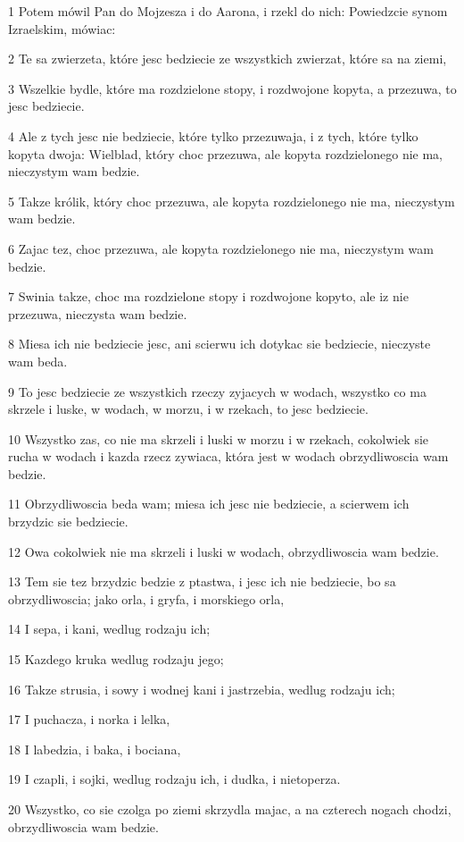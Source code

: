 \par 1 Potem mówil Pan do Mojzesza i do Aarona, i rzekl do nich: Powiedzcie synom Izraelskim, mówiac:
\par 2 Te sa zwierzeta, które jesc bedziecie ze wszystkich zwierzat, które sa na ziemi,
\par 3 Wszelkie bydle, które ma rozdzielone stopy, i rozdwojone kopyta, a przezuwa, to jesc bedziecie.
\par 4 Ale z tych jesc nie bedziecie, które tylko przezuwaja, i z tych, które tylko kopyta dwoja: Wielblad, który choc przezuwa, ale kopyta rozdzielonego nie ma, nieczystym wam bedzie.
\par 5 Takze królik, który choc przezuwa, ale kopyta rozdzielonego nie ma, nieczystym wam bedzie.
\par 6 Zajac tez, choc przezuwa, ale kopyta rozdzielonego nie ma, nieczystym wam bedzie.
\par 7 Swinia takze, choc ma rozdzielone stopy i rozdwojone kopyto, ale iz nie przezuwa, nieczysta wam bedzie.
\par 8 Miesa ich nie bedziecie jesc, ani scierwu ich dotykac sie bedziecie, nieczyste wam beda.
\par 9 To jesc bedziecie ze wszystkich rzeczy zyjacych w wodach, wszystko co ma skrzele i luske, w wodach, w morzu, i w rzekach, to jesc bedziecie.
\par 10 Wszystko zas, co nie ma skrzeli i luski w morzu i w rzekach, cokolwiek sie rucha w wodach i kazda rzecz zywiaca, która jest w wodach obrzydliwoscia wam bedzie.
\par 11 Obrzydliwoscia beda wam; miesa ich jesc nie bedziecie, a scierwem ich brzydzic sie bedziecie.
\par 12 Owa cokolwiek nie ma skrzeli i luski w wodach, obrzydliwoscia wam bedzie.
\par 13 Tem sie tez brzydzic bedzie z ptastwa, i jesc ich nie bedziecie, bo sa obrzydliwoscia; jako orla, i gryfa, i morskiego orla,
\par 14 I sepa, i kani, wedlug rodzaju ich;
\par 15 Kazdego kruka wedlug rodzaju jego;
\par 16 Takze strusia, i sowy i wodnej kani i jastrzebia, wedlug rodzaju ich;
\par 17 I puchacza, i norka i lelka,
\par 18 I labedzia, i baka, i bociana,
\par 19 I czapli, i sojki, wedlug rodzaju ich, i dudka, i nietoperza.
\par 20 Wszystko, co sie czolga po ziemi skrzydla majac, a na czterech nogach chodzi, obrzydliwoscia wam bedzie.
